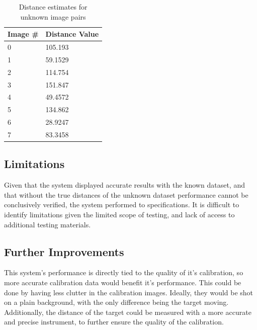 \documentclass[conference]{IEEEtran}
\begin{document}
\begin{table}[]
\caption{Distance estimates for unknown image pairs}
\label{tab:t4_guesses}
\begin{tabular}{|l|l|}
\hline
\multicolumn{1}{|l|}{\textbf{Image \#}} & \textbf{Distance Value} \\	\hline
0                                       & 105.193                 \\	\hline
1                                       & 59.1529                 \\	\hline
2                                       & 114.754                 \\	\hline
3                                       & 151.847                 \\	\hline
4                                       & 49.4572                 \\	\hline
5                                       & 134.862                 \\	\hline
6                                       & 28.9247                 \\	\hline
7                                       & 83.3458                 \\	\hline
\end{tabular}
\end{table}

\subsection{Limitations}
Given that the system displayed accurate results with the known dataset, and that without the true distances of the unknown dataset performance cannot be conclusively verified, the system performed to specifications. It is difficult to identify limitations given the limited scope of testing, and lack of access to additional testing materials.

\subsection{Further Improvements} \label{sec:further1}
 This system's performance is directly tied to the quality of it's calibration, so more accurate calibration data would benefit it's performance. This could be done by having less clutter in the calibration images. Ideally, they would be shot on a plain background, with the only difference being the target moving. Additionally, the distance of the target could be measured with a more accurate and precise instrument, to further ensure the quality of the calibration.
 
\end{document}
